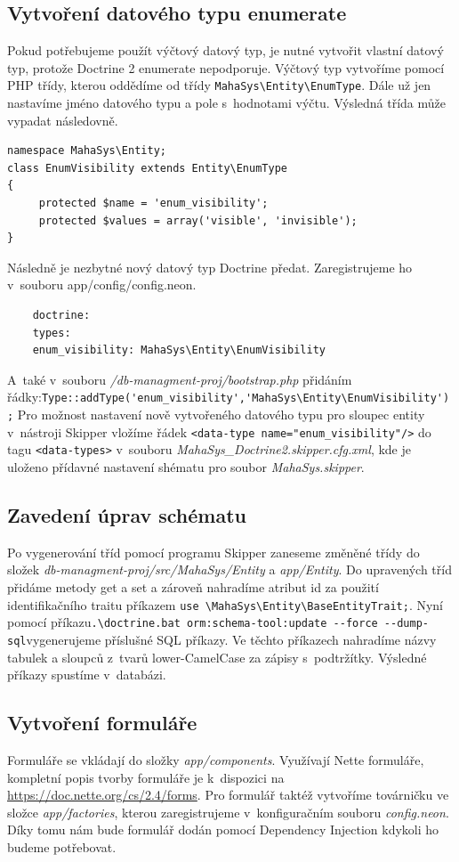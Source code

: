 \documentclass[thesis=B,czech]{FITthesis}[2012/06/26]
\begin{document}
\subsection{Vytvoření datového typu enumerate}
	Pokud potřebujeme použít výčtový datový typ, je nutné vytvořit vlastní datový typ, protože Doctrine 2 enumerate nepodporuje. Výčtový typ vytvoříme pomocí PHP třídy, kterou oddědíme od třídy \verb|MahaSys\Entity\EnumType|. Dále už jen nastavíme jméno datového typu a pole s~hodnotami výčtu. Výsledná třída může vypadat následovně.
	\begin{verbatim}
namespace MahaSys\Entity;
class EnumVisibility extends Entity\EnumType
{
     protected $name = 'enum_visibility';
     protected $values = array('visible', 'invisible');
}
	\end{verbatim}
	Následně je nezbytné nový datový typ Doctrine předat. Zaregistrujeme ho v~souboru app/config/config.neon.
	\begin{verbatim}
	doctrine:
	types: 
	enum_visibility: MahaSys\Entity\EnumVisibility
	\end{verbatim}
	A~také v~souboru \emph{/db-managment-proj/bootstrap.php} přidáním řádky:\newline\verb|Type::addType('enum_visibility','MahaSys\Entity\EnumVisibility');|
Pro možnost nastavení nově vytvořeného datového typu pro sloupec entity v~nástroji Skipper vložíme řádek \verb|<data-type name="enum_visibility"/>| do tagu \verb|<data-types>| v~souboru \emph{MahaSys\_Doctrine2.skipper.cfg.xml}, kde je uloženo přídavné nastavení shématu pro soubor \emph{MahaSys.skipper}.
\subsection{Zavedení úprav schématu}
	Po vygenerování tříd pomocí programu Skipper zaneseme změněné třídy do složek \emph{db-managment-proj/src/MahaSys/Entity} a \emph{app/Entity}. Do upravených tříd přidáme metody get a set a zároveň nahradíme atribut id za použití identifikačního traitu příkazem \verb|use \MahaSys\Entity\BaseEntityTrait;|. Nyní pomocí příkazu\newline\verb|.\doctrine.bat orm:schema-tool:update --force --dump-sql|\newline vygenerujeme příslušné SQL příkazy. Ve těchto příkazech nahradíme názvy tabulek a sloupců z~tvarů lower-CamelCase za zápisy s~podtržítky. Výsledné příkazy spustíme v~databázi.
\subsection{Vytvoření formuláře}
	Formuláře se vkládají do složky \emph{app/components}. Využívají Nette formuláře, kompletní popis tvorby formuláře je k~dispozici na \url{https://doc.nette.org/cs/2.4/forms}. Pro formulář taktéž vytvoříme továrničku ve složce \emph{app/factories}, kterou zaregistrujeme v~konfiguračním souboru \emph{config.neon}. Díky tomu nám bude formulář dodán pomocí Dependency Injection kdykoli ho budeme potřebovat. 
\end{document}
